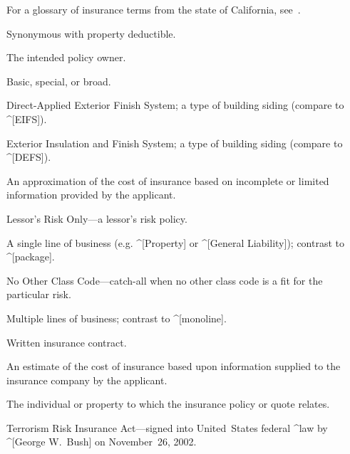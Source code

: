 %
%


For a glossary of insurance terms from the state of California,
see~\cite{gls-ins-calif}.

\begin{description}
  Synonymous with property deductible.

  The intended policy owner.

  Basic, special, or broad.

  Direct-Applied Exterior Finish System; a type of building siding (compare to
  ^[EIFS]).

  Exterior Insulation and Finish System; a type of building siding (compare to
  ^[DEFS]).

  An approximation of the cost of insurance based on incomplete or limited
  information provided by the applicant.

  Lessor's Risk Only---a lessor's risk policy.

  A single line of business (e.g. ^[Property] or ^[General Liability]); contrast
  to ^[package].

  No Other Class Code---catch-all when no other class code is a fit for the
  particular risk.

  Multiple lines of business; contrast to ^[monoline].

  Written insurance contract.

  An estimate of the cost of insurance based upon information supplied to the
  insurance company by the applicant.

  The individual or property to which the insurance policy or quote relates.

  Terrorism Risk Insurance Act---signed into United~States federal ^law by
  ^[George W.~Bush] on November~26, 2002.
\end{description}

\enddeptgroup
